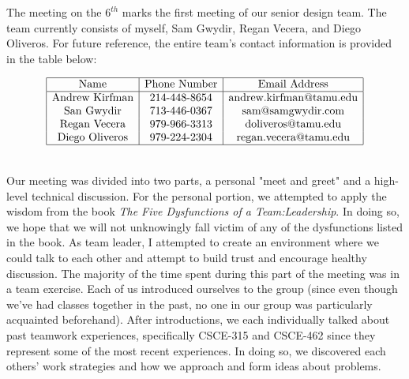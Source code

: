 \documentclass[12pt]{extarticle}
\newenvironment{myindentpar}[1]%
 {\begin{list}{}%
         {\setlength{\leftmargin}{#1}}%
         \item[]%
 }
 {\end{list}}
\begin{document}
\begin{myindentpar}{6.5mm}
    
    \noindent
    The meeting on the $6^{th}$ marks the first meeting of our senior design team.  The team currently consists of myself, Sam Gwydir, Regan Vecera, and Diego Oliveros.  For future reference, the entire team's contact information is provided in the table below:
    
    \begin{displaymath}
        \begin{array}{|c|c|c|}
            \hline
                \text{Name} & \text{Phone Number} & \text{Email Address} \\
            \hline
                \text{Andrew Kirfman} & \text{214-448-8654} & \text{andrew.kirfman@tamu.edu} \\
                \text{San Gwydir} & \text{713-446-0367} & \text{sam@samgwydir.com} \\
                \text{Regan Vecera} & \text{979-966-3313} & \text{doliveros@tamu.edu} \\
                \text{Diego Oliveros} & \text{979-224-2304} & \text{regan.vecera@tamu.edu} \\
                
            \hline
        \end{array}
    \end{displaymath}
    
    \ \\
    Our meeting was divided into two parts, a personal "meet and greet" and a high-level technical discussion.  For the personal portion, we attempted to apply the wisdom from the book \textit{The Five Dysfunctions of a Team:Leadership}.  In doing so, we hope that we will not unknowingly fall victim of any of the dysfunctions listed in the book.  As team leader, I attempted to create an environment where we could talk to each other and attempt to build trust and encourage healthy discussion.  The majority of the time spent during this part of the meeting was in a team exercise.  Each of us introduced ourselves to the group (since even though we've had classes together in the past, no one in our group was particularly acquainted beforehand).  After introductions, we each individually talked about past teamwork experiences, specifically CSCE-315 and CSCE-462 since they represent some of the most recent experiences.  In doing so, we discovered each others' work strategies and how we approach and form ideas about problems.  
    

\end{myindentpar}
\end{document}

